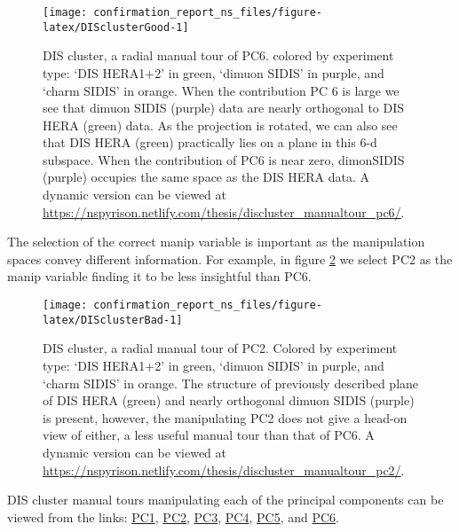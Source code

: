 \documentclass{monashthesis}
\begin{document}
\begin{figure}

{\centering \texttt{[image: confirmation\_report\_ns\_files/figure-latex/DISclusterGood-1]} 

}

\caption{DIS cluster, a radial manual tour of PC6.
colored by experiment type: `DIS HERA1+2' in green, `dimuon SIDIS' in
purple, and `charm SIDIS' in orange. When the contribution PC 6 is large
we see that dimuon SIDIS (purple) data are nearly orthogonal to DIS HERA
(green) data. As the projection is rotated, we can also see that DIS
HERA (green) practically lies on a plane in this 6-d subspace. When the
contribution of PC6 is near zero, dimonSIDIS (purple) occupies the same
space as the DIS HERA data. A dynamic version can be viewed at
\url{https://nspyrison.netlify.com/thesis/discluster_manualtour_pc6/}.}\label{fig:DISclusterGood}
\end{figure}

The selection of the correct manip variable is important as the
manipulation spaces convey different information. For example, in figure
\ref{fig:DISclusterBad} we select PC2 as the manip variable finding it
to be less insightful than PC6.










\begin{figure}

{\centering \texttt{[image: confirmation\_report\_ns\_files/figure-latex/DISclusterBad-1]} 

}

\caption{DIS cluster, a radial manual tour of PC2.
Colored by experiment type: `DIS HERA1+2' in green, `dimuon SIDIS' in
purple, and `charm SIDIS' in orange. The structure of previously
described plane of DIS HERA (green) and nearly orthogonal dimuon SIDIS
(purple) is present, however, the manipulating PC2 does not give a
head-on view of either, a less useful manual tour than that of PC6. A
dynamic version can be viewed at
\url{https://nspyrison.netlify.com/thesis/discluster_manualtour_pc2/}.}\label{fig:DISclusterBad}
\end{figure}

DIS cluster manual tours manipulating each of the principal components
can be viewed from the links:
\href{https://nspyrison.netlify.com/thesis/discluster_manualtour_pc1/}{PC1},
\href{https://nspyrison.netlify.com/thesis/discluster_manualtour_pc2/}{PC2},
\href{https://nspyrison.netlify.com/thesis/discluster_manualtour_pc3/}{PC3},
\href{https://nspyrison.netlify.com/thesis/discluster_manualtour_pc4/}{PC4},
\href{https://nspyrison.netlify.com/thesis/discluster_manualtour_pc5/}{PC5},
and
\href{https://nspyrison.netlify.com/thesis/discluster_manualtour_pc6/}{PC6}.
\end{document}
